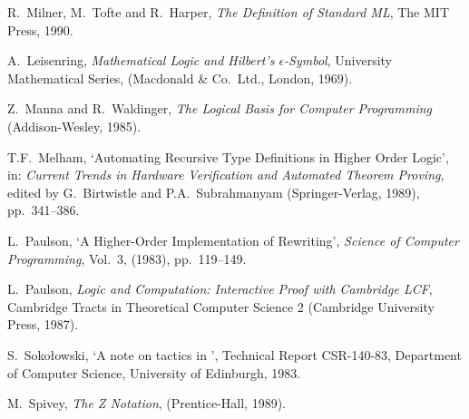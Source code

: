 \begin{thebibliography}{99}
R.\ Milner, M.\ Tofte and R.\ Harper,
{\it The Definition of Standard ML\/},
The MIT Press, 1990.

A.\ Leisenring, 
{\it Mathematical Logic and Hilbert's $\epsilon$-Symbol\/}, 
{\rm University Mathematical Series},
(Macdonald \& Co.\ Ltd., London, 1969).

Z.\ Manna and R.\ Waldinger,
{\it The Logical Basis for Computer Programming\/}
(Addison-Wesley, 1985).

T.F.\ Melham, `Automating Recursive Type Definitions 
in Higher Order Logic',
in: {\it Current Trends in Hardware Verification and
Automated Theorem Proving\/}, edited by G.\ Birtwistle 
and P.A.\ Subrahmanyam
(Springer-Verlag, 1989), pp.\ 341--386.

L.\ Paulson, 
`A Higher-Order Implementation of Rewriting',
{\it Science of Computer Programming}, Vol.\ 3, (1983), pp.\ 119--149.

 L.\ Paulson, 
{\it Logic and Computation: Interactive Proof with Cambridge LCF}, 
Cambridge Tracts in Theoretical Computer Science 2
(Cambridge University Press, 1987).

%
S.\ Soko\l owski, `A note on tactics in \LCF', 
Technical Report CSR-140-83, Department of Computer Science,
University of Edinburgh, 1983.


M.\ Spivey, 
{\it The Z Notation}, (Prentice-Hall, 1989).

\end{thebibliography}


